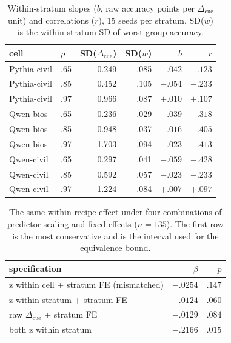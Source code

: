 \documentclass[11pt]{article}
\newcommand{\cued}{\ensuremath{\Delta_{\mathrm{cue}}}}
\begin{document}
\begin{table}[t]
\centering\small
\setlength{\tabcolsep}{4.5pt}
\begin{tabular}{llrrrr}
\toprule
cell & $\rho$ & SD(\cued) & SD($w$) & $b$ & $r$ \\
\midrule
Pythia-civil & .65 & 0.249 & .085 & $-.042$ & $-.123$ \\
Pythia-civil & .85 & 0.452 & .105 & $-.054$ & $-.233$ \\
Pythia-civil & .97 & 0.966 & .087 & $+.010$ & $+.107$ \\
Qwen-bios    & .65 & 0.236 & .029 & $-.039$ & $-.318$ \\
Qwen-bios    & .85 & 0.948 & .037 & $-.016$ & $-.405$ \\
Qwen-bios    & .97 & 1.703 & .094 & $-.023$ & $-.413$ \\
Qwen-civil   & .65 & 0.297 & .041 & $-.059$ & $-.428$ \\
Qwen-civil   & .85 & 0.592 & .057 & $-.023$ & $-.233$ \\
Qwen-civil   & .97 & 1.224 & .084 & $+.007$ & $+.097$ \\
\bottomrule
\end{tabular}
\caption{Within-stratum slopes ($b$, raw accuracy points per \cued{} unit)
and correlations ($r$), 15 seeds per stratum. SD($w$) is the within-stratum
SD of worst-group accuracy.}
\label{tab:strata}
\end{table}

\begin{table}[t]
\centering\small
\setlength{\tabcolsep}{4.5pt}
\begin{tabular}{lrr}
\toprule
specification & $\beta$ & $p$ \\
\midrule
z within cell + stratum FE (mismatched) & $-.0254$ & $.147$ \\
z within stratum + stratum FE           & $-.0124$ & $.060$ \\
raw \cued{} + stratum FE                & $-.0129$ & $.084$ \\
both z within stratum                   & $-.2166$ & $.015$ \\
\bottomrule
\end{tabular}
\caption{The same within-recipe effect under four combinations of predictor
scaling and fixed effects ($n{=}135$). The first row is the most
conservative and is the interval used for the equivalence bound.}
\label{tab:standard}
\end{table}
\end{document}
